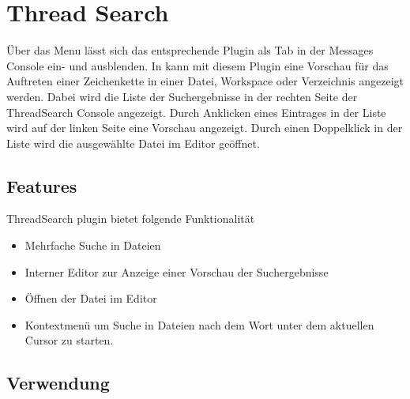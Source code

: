 \section{Thread Search}\label{sec:thread_search}

Über das Menu  lässt sich das entsprechende Plugin als Tab in der Messages Console ein- und ausblenden. In \codeblocks kann mit diesem Plugin eine Vorschau für das Auftreten einer Zeichenkette in einer Datei, Workspace oder Verzeichnis angezeigt werden. Dabei wird die Liste der Suchergebnisse in der rechten Seite der ThreadSearch Console angezeigt. Durch Anklicken eines Eintrages in der Liste wird auf der linken Seite eine Vorschau angezeigt. Durch einen Doppelklick in der Liste wird die ausgewählte Datei im \codeblocks Editor geöffnet.


\subsection{Features}

ThreadSearch plugin bietet folgende Funktionalität

\begin{itemize}
\item Mehrfache Suche in Dateien
\item Interner Editor zur Anzeige einer Vorschau der Suchergebnisse
\item Öffnen der Datei im Editor
\item Kontextmenü  um Suche in Dateien nach dem Wort unter dem aktuellen Cursor zu starten.
\end{itemize}


\subsection{Verwendung}

